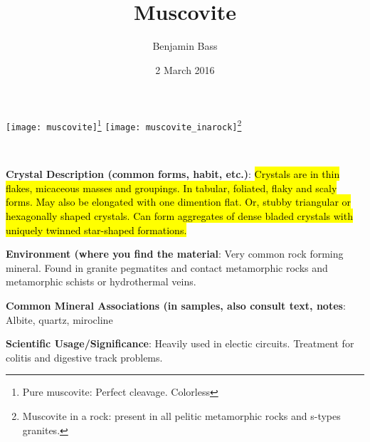 \documentclass[10pt]{article}
\author{Benjamin Bass}
\date{2 March 2016}
\title{\vspace{-2.0cm}Muscovite} %
\begin{document}
\maketitle


\begin{center}
  \texttt{[image: muscovite]}\footnote{Pure muscovite: Perfect cleavage. Colorless}
  \texttt{[image: muscovite\_inarock]}\footnote{Muscovite in a rock: present in all pelitic metamorphic rocks and s-types granites.}
\end{center}



\
\
\
\
\
\
\
\
\
\

\begin{framed}
  \textbf{Crystal Description (common forms, habit, etc.)}: \hl{Crystals are in thin flakes, micaceous masses and groupings. In tabular, foliated, flaky and scaly forms. May also be elongated with one dimention flat. Or, stubby triangular or hexagonally shaped crystals. Can form aggregates of dense bladed crystals with uniquely twinned star-shaped formations.}
\end{framed}

\begin{framed}
  \textbf{Environment (where you find the material}: Very common rock forming mineral. Found in granite pegmatites and contact metamorphic rocks and metamorphic schists or hydrothermal veins.
\end{framed}

\begin{framed}
  \textbf{Common Mineral Associations (in samples, also consult text, notes}: Albite, quartz, mirocline
\end{framed}

\begin{framed}
  \textbf{Scientific Usage/Significance}: Heavily used in electic circuits. Treatment for colitis and digestive track problems.
\end{framed}
\end{document}
